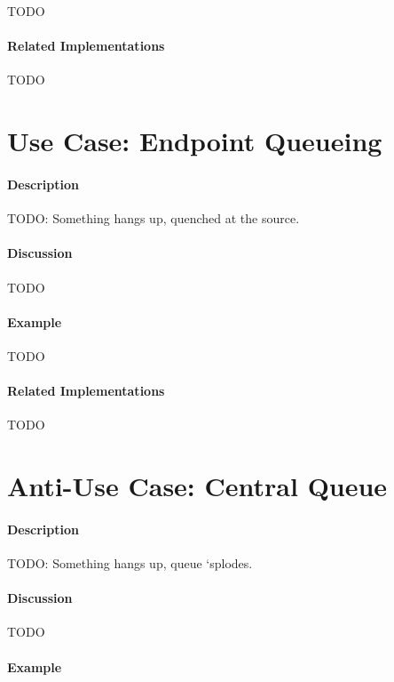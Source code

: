 {\Large TODO}

\paragraph{Related Implementations}

{\Large TODO}

\section{Use Case: Endpoint Queueing}

\paragraph{Description}

{\Large TODO:} Something hangs up, quenched at the source.

\paragraph{Discussion}

{\Large TODO}

\paragraph{Example}

{\Large TODO}

\paragraph{Related Implementations}

{\Large TODO}

\section{Anti-Use Case: Central Queue}

\paragraph{Description}

{\Large TODO:} Something hangs up, queue `splodes.

\paragraph{Discussion}

{\Large TODO}

\paragraph{Example}

